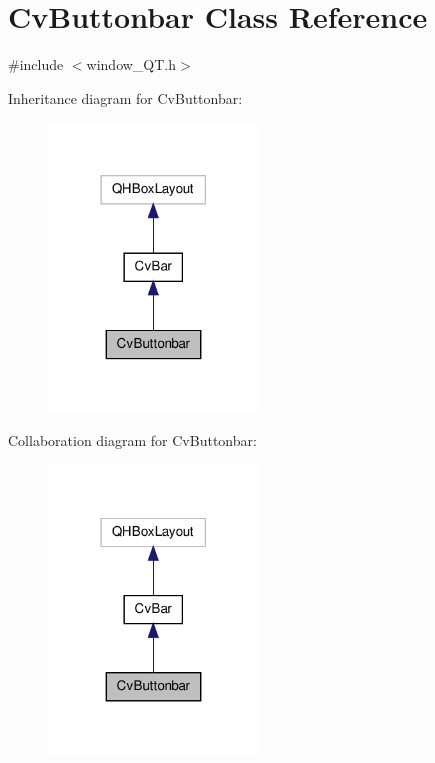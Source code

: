 \hypertarget{classCvButtonbar}{\section{Cv\-Buttonbar Class Reference}
\label{classCvButtonbar}
}


{\ttfamily \#include $<$window\-\_\-\-Q\-T.\-h$>$}



Inheritance diagram for Cv\-Buttonbar\-:\nopagebreak
\begin{figure}[H]
\begin{center}
\leavevmode
\includegraphics[width=158pt]{classCvButtonbar__inherit__graph}
\end{center}
\end{figure}


Collaboration diagram for Cv\-Buttonbar\-:\nopagebreak
\begin{figure}[H]
\begin{center}
\leavevmode
\includegraphics[width=158pt]{classCvButtonbar__coll__graph}
\end{center}
\end{figure}
